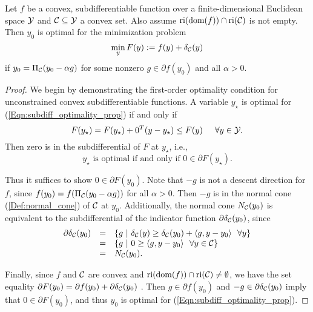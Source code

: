 \begin{enumerate}
\begin{prop} 			\label{Prop:PLGD-opt_unconstrained}
Let $f$ be a convex, subdifferentiable function over a finite-dimensional Euclidean space ${\mathcal Y}$ and ${\mathcal C} \subseteq {\mathcal Y}$ a convex set.  Also assume $\textnormal{ri}( \textnormal{dom} (f)) \cap \textnormal{ri}({\mathcal C})$ is not empty.   Then $y_0$ is optimal for the minimization problem
\begin{equation} 			\label{Eqn:subdiff_optimality_prop}
\min_{\substack{y}} F(y) := f(y) + \delta_{\mathcal C}(y)
\end{equation}
if $y_0 = \Pi_{\mathcal C}(y_0 - \alpha g)$ for some nonzero $g \in \partial f(y_0)$ and all $\alpha >0$.
\end{prop}

\begin{proof}
We begin by demonstrating the first-order optimality condition for unconstrained convex subdifferentiable functions.  A variable $y_\star$ is optimal for (\ref{Eqn:subdiff_optimality_prop}) if and only if
\begin{equation}
F(y_\star) = F(y_\star) + 0^T(y - y_\star)  \leq F(y)	\hspace{.5cm} \forall y \in {\mathcal Y}.
\end{equation}
Then zero is in the subdifferential of $F$ at $y_\star$, i.e.,
\begin{equation}
y_\star \text{ is optimal if and only if } 0 \in \partial F(y_\star).
\end{equation}

Thus it suffices to show $0 \in \partial F(y_0)$.  Note that $-g$ is not a descent direction for $f$, since $f(y_0) = f(\Pi_{\mathcal C}(y_0 - \alpha g))$ for all $\alpha >0$.  Then $-g$ is in the normal cone (\ref{Def:normal_cone}) of ${\mathcal C}$ at $y_0$.  Additionally, the normal cone $N_{\mathcal C}(y_0)$ is equivalent to the subdifferential of the indicator function $\partial \delta_{\mathcal C}(y_0)$, since
\begin{equation}
\begin{array}{rcl}
\partial \delta_\caC(y_0)
	&	=	&	\{ g \ | \ \delta_\caC(y) \geq \delta_\caC(y_0) + \langle g, y - y_0 \rangle \ \ \forall y \}	\\
	&	=	& \{ g \ | \ 0 \geq  \langle g, y - y_0 \rangle \ \ \forall y \in \caC \}	\\
	&	=	&	N_\caC(y_0).
\end{array}
\end{equation}

Finally, since $f$ and ${\mathcal C}$ are convex and $\textnormal{ri}( \textnormal{dom} (f)) \cap \textnormal{ri}({\mathcal C}) \neq \emptyset$, we have the set equality $\partial F(y_0) = \partial f(y_0) + \partial \delta_{\mathcal C}(y_0)$ \cite[Theorem 23.8]{rockafellar1970convex}.  Then $g \in \partial f(y_0)$ and $-g \in \partial \delta_{\mathcal C}(y_0)$ imply that $0 \in \partial F(y_0)$, and thus $y_0$ is optimal for (\ref{Eqn:subdiff_optimality_prop}).


\end{proof}
\end{enumerate}
